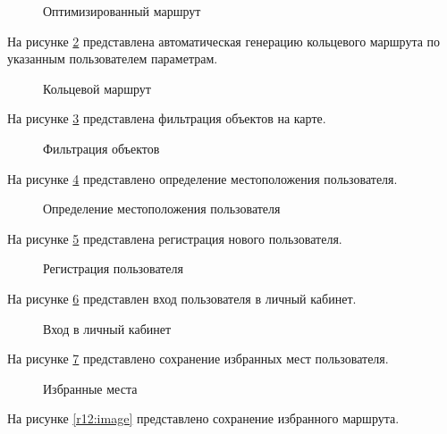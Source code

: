 \begin{figure}[H]
	\center{\texttt{[image: r11]}}
	\caption{Оптимизированный маршрут}
	\label{r11:image}
\end{figure}

\newpage
На рисунке \ref{r5:image} представлена автоматическая генерацию кольцевого маршрута по указанным пользователем параметрам.

\begin{figure}[H]
	\center{\texttt{[image: r5]}}
	\caption{Кольцевой маршрут}
	\label{r5:image}
\end{figure}

\newpage
На рисунке \ref{r6:image} представлена фильтрация объектов на карте.

\begin{figure}[H]
	\center{\texttt{[image: r6]}}
	\caption{Фильтрация объектов}
	\label{r6:image}
\end{figure}

На рисунке \ref{r7:image} представлено определение местоположения пользователя.

\begin{figure}[H]
	\center{\texttt{[image: r7]}}
	\caption{Определение местоположения пользователя}
	\label{r7:image}
\end{figure}

\newpage
На рисунке \ref{r8:image} представлена регистрация нового пользователя.

\begin{figure}[H]
	\center{\texttt{[image: r8]}}
	\caption{Регистрация пользователя}
	\label{r8:image}
\end{figure}

На рисунке \ref{r9:image} представлен вход пользователя в личный кабинет.

\begin{figure}[H]
	\center{\texttt{[image: r9]}}
	\caption{Вход в личный кабинет}
	\label{r9:image}
\end{figure}

\newpage
На рисунке \ref{r10:image} представлено сохранение избранных мест пользователя.

\begin{figure}[H]
	\center{\texttt{[image: r10]}}
	\caption{Избранные места}
	\label{r10:image}
\end{figure}

На рисунке \ref{r12:image} представлено сохранение избранного маршрута.

